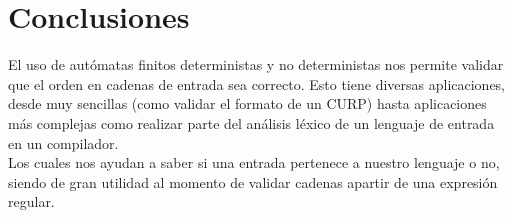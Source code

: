 \section{Conclusiones}
	El uso de autómatas finitos deterministas y no deterministas nos permite validar que el orden en cadenas de entrada sea correcto.
	Esto tiene diversas aplicaciones, desde muy sencillas (como validar el formato de un CURP) hasta aplicaciones más complejas como realizar parte del análisis léxico de un lenguaje de entrada en un compilador.\\Los cuales nos ayudan a saber si una entrada pertenece a nuestro lenguaje o no, siendo de gran utilidad al momento de validar cadenas apartir de una expresión regular.